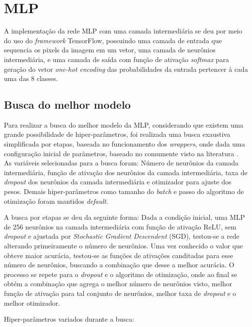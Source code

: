 \clearpage
\section{MLP}

A implementação da rede MLP com uma camada intermediária se deu por meio do uso do \textit{framework} TensorFlow, possuindo uma camada de entrada que sequencia os pixels da imagem em um vetor, uma camada de neurônios intermediária, e uma camada de saída com função de ativação \textit{softmax} para geração do vetor \textit{one-hot encoding} das probabilidades da entrada pertencer à cada uma das 8 classes.

\subsection{Busca do melhor modelo}

Para realizar a busca do melhor modelo da MLP, considerando que existem uma grande possibilidade de hiper-parâmetros, foi realizada uma busca exaustiva simplificada por etapas, baseada no funcionamento dos \textit{wrappers}, onde dada uma configuração inicial de parâmetros, baseado no comumente visto na literatura \cite{geron2019hands}. As variáveis selecionadas para a busca foram: Número de neurônios da camada intermediária, função de ativação dos neurônios da camada intermediária, taxa de \textit{dropout} dos neurônios da camada intermediária e otimizador para ajuste dos pesos. Demais hiper-parâmetros como tamanho do \textit{batch} e passo do algoritmo de otimização foram mantidos \textit{default}.

A busca por etapas se deu da seguinte forma: Dada a condição inicial, uma MLP de 256 neurônios na camada intermediária com função de ativação ReLU, sem \textit{dropout} e ajustada por \textit{Stochastic Gradient Descendent} (SGD), testou-se a rede alterando primeiramente o número de neurônios. Uma vez conhecido o valor que obteve maior acurácia, testou-se as funções de ativações canditadas para esse número de neurônios, buscando a combinação que desse a melhor acurácia. O processo se repete para o \textit{dropout} e o algoritmo de otimização, onde ao final se obtém a combinação que agrega o melhor número de neurônios visto, melhor função de ativação para tal conjunto de neurônios, melhor taxa de \textit{dropout} e o melhor otimizador.

Hiper-parâmetros variados durante a busca:


